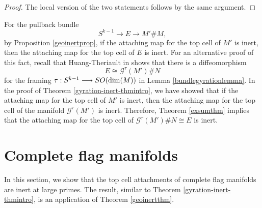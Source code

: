 \documentclass[a4]{amsart}
\theoremstyle{definition}
\begin{document}
\begin{sloppypar}
\begin{proof}
The local version of the two statements follows by the same argument. 
\end{proof}


For the pullback bundle
\[
S^{k-1}\stackrel{}{\longrightarrow} E\stackrel{}{\longrightarrow} M'\# M,
 \]
by Proposition \ref{geoinertprop}, if the attaching map for the top cell of $M'$ is inert, then the attaching map for the top cell of $E$ is inert. 
For an alternative proof of this fact, recall that Huang-Theriault in \cite[Lemma 3.1]{HT23} shows that there is a diffeomorphism
\[
E\cong \mathcal{G}^{\tau}(M') \# N
\]
for the framing $\tau: S^{k-1}\stackrel{}{\longrightarrow} SO({\rm dim}(M))$ in Lemma \ref{bundlegyrationlemma}. In the proof of Theorem \ref{gyration-inert-thmintro}, we have showed that if the attaching map for the top cell of $M'$ is inert, then the attaching map for the top cell of the manifold $\mathcal{G}^{\tau}(M')$ is inert. 
Therefore, Theorem \ref{exsumthm} implies that the attaching map for the top cell of $ \mathcal{G}^{\tau}(M') \# N\cong E$ is inert. 

\newpage
\section{Complete flag manifolds}
\label{sec: flag}
In this section, we show that the top cell attachments of complete flag manifolds are inert at large primes. The result, similar to Theorem \ref{gyration-inert-thmintro}, is an application of Theorem \ref{geoinertthm}.


\end{sloppypar}
\end{document}
